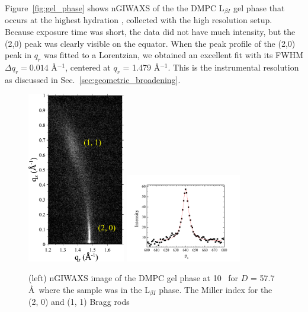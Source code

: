 Figure~\ref{fig:gel_phase} shows nGIWAXS of the the DMPC L$_{\beta I}$ gel phase
that occurs at the highest hydration \cite{ref:Smith88,Tristram-Nagle02},
collected with the high resolution setup. Because exposure time was short,
the data did not have much intensity, but the (2,0) peak was clearly 
visible on the equator.
When the peak profile of the (2,0) peak in $q_r$ was fitted to a Lorentzian, 
we obtained an excellent fit with its FWHM $\Delta q_r = 0.014$ \AA$^{-1}$,
centered at $q_r$ = 1.479 \AA$^{-1}$.
This is the instrumental resolution as discussed in Sec.~\ref{sec:geometric_broadening}. 

\begin{figure}[htbp]
  \centering
  \includegraphics[width=0.38\textwidth]{figures/ripple/nGIWAXS/dmpc1_107}
  \qquad
  \includegraphics[trim=50 0 50 0,clip,width=0.45\textwidth]{figures/ripple/nGIWAXS/dmpc1_107_gel_phase_20_swath_8px}
  \caption[(left) nGIWAXS image of the DMPC gel phase
  at 10 \textcelsius\ for $D$ = 57.7 \AA\ where the sample was in the 
  L$_{\beta I}$ phase]
  {(left) nGIWAXS image of the DMPC gel phase
  at 10 \textcelsius\ for $D$ = 57.7 \AA\ where the sample was in the 
  L$_{\beta I}$ phase. The Miller index for the (2, 0) and (1, 1) Bragg rods
}
\end{figure}

